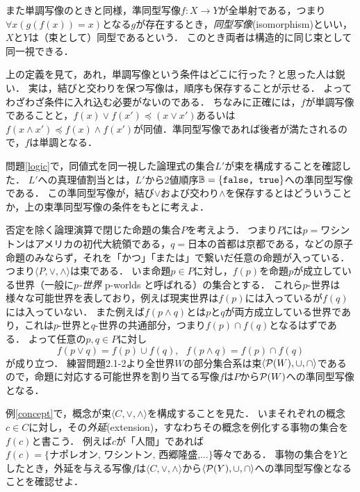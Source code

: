 \documentclass[11pt,a4paper, dvipdfmx]{jsarticle}
\begin{document}
また単調写像のときと同様，準同型写像$f:X \to Y$が全単射である，つまり$\forall x (g(f(x))=x)$となる$g$が存在するとき，\emph{同型写像}(isomorphism)といい，$X$と$Y$は（束として）同型であるという．
このとき両者は構造的に同じ束として同一視できる．


\begin{attn}
上の定義を見て，あれ，単調写像という条件はどこに行った？と思った人は鋭い．
実は，結びと交わりを保つ写像は，順序も保存することが示せる．
よってわざわざ条件に入れ込む必要がないのである．
ちなみに正確には，$f$が単調写像であることと，$f(x) \vee f(x') \preceq (x \vee x')$あるいは$f(x \wedge x') \preceq f(x) \wedge f(x')$が同値．準同型写像であれば後者が満たされるので，$f$は単調となる．
\end{attn}

\begin{example}[真理値関数としての束準同型] \label{truthfunction}
問題\ref{logic}で，同値式を同一視した論理式の集合$L'$が束を構成することを確認した．
$L'$への真理値割当とは，$L'$から2値順序$\mathbb{B} = \{ \texttt{false, true} \}$への準同型写像である．
この準同型写像が，結び$\vee$および交わり$\wedge$を保存するとはどういうことか，上の束準同型写像の条件をもとに考えよ．
\end{example}

\begin{example}[命題と可能世界]\label{p-worlds}
否定を除く論理演算で閉じた命題の集合$P$を考えよう．
つまり$P$には$p=$ワシントンはアメリカの初代大統領である，$q=$日本の首都は京都である，などの原子命題のみならず，それを「かつ」「または」で繋いだ任意の命題が入っている．つまり$\langle P, \vee, \wedge \rangle$は束である．
いま命題$p \in P$に対し，$f(p)$を命題$p$が成立している世界（一般に\emph{$p$-世界} p-worlds と呼ばれる）の集合とする．
これら$p$-世界は様々な可能世界を表しており，例えば現実世界は$f(p)$には入っているが$f(q)$には入っていない．
また例えば$f(p \wedge q)$とは$p$と$q$が両方成立している世界であり，これは$p$-世界と$q$-世界の共通部分，つまり$f(p) \cap f(q)$となるはずである．
よって任意の$p, q \in P$に対し
\[ f(p \vee q) = f(p) \cup f(q), \ \ \ f(p \wedge q) = f(p) \cap f(q) \]
が成り立つ．
練習問題2.1-2より全世界$W$の部分集合系は束$\langle \mathcal{P}(W), \cup, \cap \rangle$であるので，命題に対応する可能世界を割り当てる写像$f$は$P$から$\mathcal{P}(W)$への準同型写像となる．
\end{example}

\begin{example}[概念の外延] \label{extension}
例\ref{concept}で，概念が束$\langle C, \vee, \wedge \rangle$を構成することを見た．
いまそれぞれの概念$c \in C$に対し，その\emph{外延}(extension)，すなわちその概念を例化する事物の集合を$f(c)$と書こう．
例えば$c$が「人間」であれば$f(c)=\{\text{ナポレオン, ワシントン, 西郷隆盛,}\dots\}$等々である．
事物の集合を$Y$としたとき，外延を与える写像$f$は$\langle C, \vee, \wedge \rangle$から$\langle \mathcal{P}(Y), \cup, \cap \rangle$への準同型写像となることを確認せよ．
\end{example}
\end{document}
